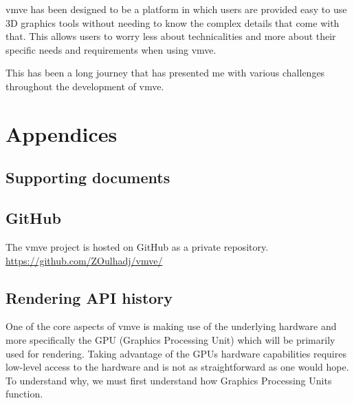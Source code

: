 \documentclass[11pt]{article}
\begin{document}
\gls*{vmve} has been designed to be a platform in which users are provided easy to use
3D graphics tools without needing to know the complex details that come with
that. This allows users to worry less about technicalities and more about their
specific needs and requirements when using \gls*{vmve}.

This has been a long journey that has presented me with various challenges
throughout the development of \gls*{vmve}.

\clearpage
\printnoidxglossary

\clearpage
\printnoidxglossary[type=\acronymtype]

\clearpage



\clearpage
\section{Appendices}

\subsection{Supporting documents} \label{supporting_documents}


\subsection{GitHub} \label{github}
The \gls*{vmve} project is hosted on GitHub as a private repository.
\url{https://github.com/ZOulhadj/vmve/}

\subsection{Rendering API history} \label{rendering_api_appendix}
One of the core aspects of \gls*{vmve} is making use of the underlying hardware and
more specifically the GPU (Graphics Processing Unit) which will be primarily
used for rendering. Taking advantage of the GPUs hardware capabilities requires
low-level access to the hardware and is not as straightforward as one would
hope. To understand why, we must first understand how Graphics Processing Units
function.
\end{document}
